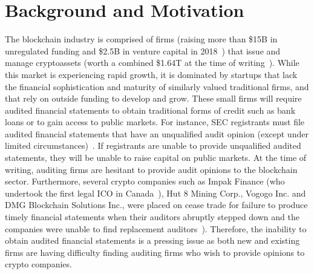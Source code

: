 





\section{Background and Motivation} \label{sec:auditing:background}

The blockchain industry is comprised of firms (raising more than \$15B in unregulated funding and \$2.5B in venture capital in 2018~\cite{coindesk2018}) that issue and manage cryptoassets (worth a combined \$1.64T at the time of writing~\cite{coinmarketcap}). While this market is experiencing rapid growth, it is dominated by startups that lack the financial sophistication and maturity of similarly valued traditional firms, and that rely on outside funding to develop and grow. These small firms will require audited financial statements to obtain traditional forms of credit such as bank loans or to gain access to public markets. For instance, SEC registrants must file audited financial statements that have an unqualified audit opinion (except under limited circumstances)~\cite{securities2009financial}. If registrants are unable to provide unqualified audited statements, they will be unable to raise capital on public markets. At the time of writing, auditing firms are hesitant to provide audit opinions to the blockchain sector. Furthermore, several crypto companies such as Impak Finance (who undertook the first legal ICO in Canada~\cite{AMFImpactFinance}), Hut 8 Mining Corp., Vogogo Inc. and DMG Blockchain Solutions Inc., were placed on cease trade for failure to produce timely financial statements when their auditors abruptly stepped down and the companies were unable to find replacement auditors~\cite{posadzki2019crypto}). Therefore, the inability to obtain audited financial statements is a pressing issue as both new and existing firms are having difficulty finding auditing firms who wish to provide opinions to crypto companies.

